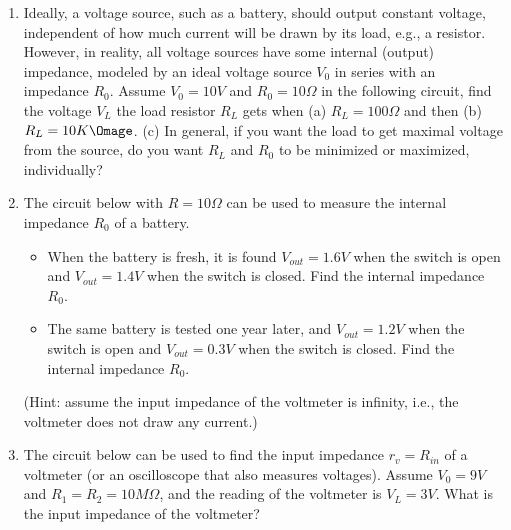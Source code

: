 \begin{enumerate}

\item Ideally, a voltage source, such as a battery, should output constant voltage,
  independent of how much current will be drawn by its load, e.g., a resistor. However, 
  in reality, all voltage sources have some internal (output) impedance, modeled by an 
  ideal voltage source $V_0$ in series with an impedance $R_0$. Assume $V_0=10V$ and 
  $R_0=10\Omega$ in the following circuit, find the voltage $V_L$ the load resistor 
  $R_L$ gets when (a) $R_L=100 \Omega$ and then (b) $R_L=10K\Omage$. 
  (c) In general, if you want the load to get maximal voltage from the source, do you 
  want $R_L$ and $R_0$ to be minimized or maximized, individually?






\item The circuit below with $R=10 \Omega$ can be used to measure the internal 
  impedance $R_0$ of a battery.
  \begin{itemize}
    \item When the battery is fresh, it is found $V_{out}=1.6V$ when the switch is open 
      and $V_{out}=1.4V$ when the switch is closed. Find the internal impedance $R_0$.
    \item The same battery is tested one year later, and $V_{out}=1.2V$ when the switch 
      is open and $V_{out}=0.3V$ when the switch is closed. Find the internal impedance 
      $R_0$.
  \end{itemize}
(Hint: assume the input impedance of the voltmeter is infinity, i.e., the voltmeter
  does not draw any current.)



\item The circuit below can be used to find the input impedance $r_v=R_{in}$ of 
  a voltmeter (or an oscilloscope that also measures voltages). Assume $V_0=9V$
  and $R_1=R_2=10 M\Omega$, and the reading of the voltmeter is $V_L=3V$. 
  What is the input impedance of the voltmeter?
  

\end{enumerate}
